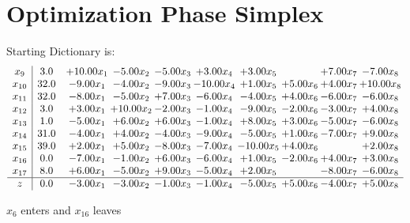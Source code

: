 \documentclass[9pt]{article}
\begin{document}
\section{Optimization Phase Simplex}
Starting Dictionary is:
\[\begin{array}{c| c c@{\hskip 2pt} c@{\hskip 2pt} c@{\hskip 2pt} c@{\hskip 2pt} c@{\hskip 2pt} c@{\hskip 2pt} c@{\hskip 2pt} c@{\hskip 2pt} }
 x_{9}   &  3.0 & + 10.00 x_{1} & -5.00 x_{2} & -5.00 x_{3} & +  3.00 x_{4} & +  3.00 x_{5} &   & +  7.00 x_{7} & -7.00 x_{8}\\
 x_{10}   &  32.0 & -9.00 x_{1} & -4.00 x_{2} & -9.00 x_{3} & -10.00 x_{4} & +  1.00 x_{5} & +  5.00 x_{6} & +  4.00 x_{7} & + 10.00 x_{8}\\
 x_{11}   &  32.0 & -8.00 x_{1} & -5.00 x_{2} & +  7.00 x_{3} & -6.00 x_{4} & -4.00 x_{5} & +  4.00 x_{6} & -6.00 x_{7} & -6.00 x_{8}\\
 x_{12}   &  3.0 & +  3.00 x_{1} & + 10.00 x_{2} & -2.00 x_{3} & -1.00 x_{4} & -9.00 x_{5} & -2.00 x_{6} & -3.00 x_{7} & +  4.00 x_{8}\\
 x_{13}   &  1.0 & -5.00 x_{1} & +  6.00 x_{2} & +  6.00 x_{3} & -1.00 x_{4} & +  8.00 x_{5} & +  3.00 x_{6} & -5.00 x_{7} & -6.00 x_{8}\\
 x_{14}   &  31.0 & -4.00 x_{1} & +  4.00 x_{2} & -4.00 x_{3} & -9.00 x_{4} & -5.00 x_{5} & +  1.00 x_{6} & -7.00 x_{7} & +  9.00 x_{8}\\
 x_{15}   &  39.0 & +  2.00 x_{1} & +  5.00 x_{2} & -8.00 x_{3} & -7.00 x_{4} & -10.00 x_{5} & +  4.00 x_{6} &   & +  2.00 x_{8}\\
 x_{16}   &  0.0 & -7.00 x_{1} & -1.00 x_{2} & +  6.00 x_{3} & -6.00 x_{4} & +  1.00 x_{5} & -2.00 x_{6} & +  4.00 x_{7} & +  3.00 x_{8}\\
 x_{17}   &  8.0 & +  6.00 x_{1} & -5.00 x_{2} & +  9.00 x_{3} & -5.00 x_{4} & +  2.00 x_{5} &   & -8.00 x_{7} & -6.00 x_{8}\\
\hline
z    &  0.0 & -3.00 x_{1} & -3.00 x_{2} & -1.00 x_{3} & -1.00 x_{4} & -5.00 x_{5} & +  5.00 x_{6} & -4.00 x_{7} & +  5.00 x_{8}\\
\end{array}\]


 $ x_{6} $ enters and $ x_{16} $ leaves 
\end{document}
